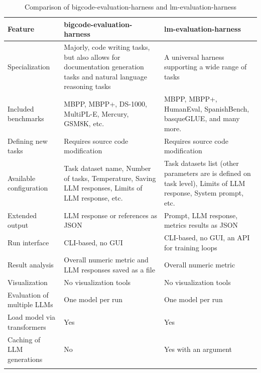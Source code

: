 \begin{longtable}{|p{4cm}|p{5cm}|p{5cm}|}
        \hline
        \textbf{Feature} & \textbf{bigcode-evaluation-harness} & \textbf{lm-evaluation-harness} \\
        \hline
        Specialization & Majorly, code writing tasks, but also allows for documentation generation tasks and natural language reasoning tasks & A universal harness supporting a wide range of tasks \\
        \hline
        Included benchmarks & MBPP, MBPP+, DS-1000, MultiPL-E, Mercury, GSM8K, etc. & MBPP, MBPP+, HumanEval, SpanishBench, basqueGLUE, and many more. \\
        \hline
        Defining new tasks & Requires source code modification & Requires source code modification \\
        \hline
        Available configuration & Task dataset name, Number of tasks, Temperature, Saving LLM responses, Limits of LLM response, etc. & Task datasets list (other parameters are is defined on task level), Limits of LLM response, System prompt, etc.  \\
        \hline
        Extended output & LLM response or references as JSON & Prompt, LLM response, metrics results as JSON \\
        \hline
        Run interface & CLI-based, no GUI & CLI-based, no GUI, an API for training loops \\
        \hline
        Result analysis & Overall numeric metric and LLM responses saved as a file & Overall numeric metric \\
        \hline
        Visualization & No visualization tools & No visualization tools \\
        \hline
        Evaluation of multiple LLMs & One model per run & One model per run \\
        \hline
        Load model via transformers & Yes & Yes \\
        \hline
        Caching of LLM generations & No & Yes with an argument \\
        \hline
    \caption{Comparison of bigcode-evaluation-harness and lm-evaluation-harness}
    \label{tab:framework-comparison}
\end{longtable}

